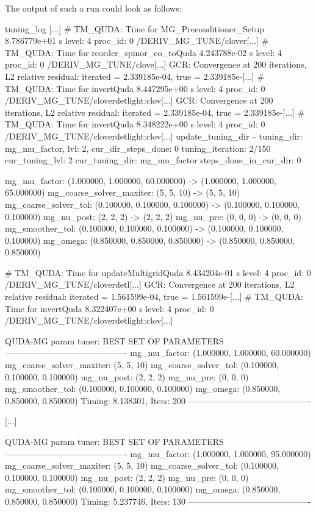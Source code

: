 The output of such a run could look as follows:

\begin{SaveVerbatim}{tuning_log}
[...]
# TM_QUDA: Time for MG_Preconditioner_Setup 8.786779e+01 s level: 4 proc_id: 0 /DERIV_MG_TUNE/clover[...]
# TM_QUDA: Time for reorder_spinor_eo_toQuda 4.243788e-02 s level: 4 proc_id: 0 /DERIV_MG_TUNE/clove[...]
GCR: Convergence at 200 iterations, L2 relative residual: iterated = 2.339185e-04, true = 2.339185e-[...]
# TM_QUDA: Time for invertQuda 8.447295e+00 s level: 4 proc_id: 0 /DERIV_MG_TUNE/cloverdetlight:clov[...]
GCR: Convergence at 200 iterations, L2 relative residual: iterated = 2.339185e-04, true = 2.339185e-[...]
# TM_QUDA: Time for invertQuda 8.348222e+00 s level: 4 proc_id: 0 /DERIV_MG_TUNE/cloverdetlight:clov[...]
update_tuning_dir -- tuning_dir: mg_mu_factor, lvl: 2, cur_dir_steps_done: 0
tuning_iteration: 2/150
cur_tuning_lvl: 2
cur_tuning_dir: mg_mu_factor
steps_done_in_cur_dir: 0

             mg_mu_factor: (1.000000, 1.000000, 60.000000) -> (1.000000, 1.000000, 65.000000)
 mg_coarse_solver_maxiter: (5, 5, 10) -> (5, 5, 10)
     mg_coarse_solver_tol: (0.100000, 0.100000, 0.100000) -> (0.100000, 0.100000, 0.100000)
               mg_nu_post: (2, 2, 2) -> (2, 2, 2)
                mg_nu_pre: (0, 0, 0) -> (0, 0, 0)
          mg_smoother_tol: (0.100000, 0.100000, 0.100000) -> (0.100000, 0.100000, 0.100000)
                 mg_omega: (0.850000, 0.850000, 0.850000) -> (0.850000, 0.850000, 0.850000)

# TM_QUDA: Time for updateMultigridQuda 8.434204e-01 s level: 4 proc_id: 0 /DERIV_MG_TUNE/cloverdetl[...]
GCR: Convergence at 200 iterations, L2 relative residual: iterated = 1.561599e-04, true = 1.561599e-[...]
# TM_QUDA: Time for invertQuda 8.322407e+00 s level: 4 proc_id: 0 /DERIV_MG_TUNE/cloverdetlight:clov[...]

QUDA-MG param tuner: BEST SET OF PARAMETERS
-------------------------------------------
             mg_mu_factor: (1.000000, 1.000000, 60.000000)
 mg_coarse_solver_maxiter: (5, 5, 10)
     mg_coarse_solver_tol: (0.100000, 0.100000, 0.100000)
               mg_nu_post: (2, 2, 2)
                mg_nu_pre: (0, 0, 0)
          mg_smoother_tol: (0.100000, 0.100000, 0.100000)
                 mg_omega: (0.850000, 0.850000, 0.850000)
Timing: 8.138301, Iters: 200
-------------------------------------------

[...]

QUDA-MG param tuner: BEST SET OF PARAMETERS
-------------------------------------------
             mg_mu_factor: (1.000000, 1.000000, 95.000000)
 mg_coarse_solver_maxiter: (5, 5, 10)
     mg_coarse_solver_tol: (0.100000, 0.100000, 0.100000)
               mg_nu_post: (2, 2, 2)
                mg_nu_pre: (0, 0, 0)
          mg_smoother_tol: (0.100000, 0.100000, 0.100000)
                 mg_omega: (0.850000, 0.850000, 0.850000)
Timing: 5.237746, Iters: 130
-------------------------------------------


\end{SaveVerbatim}
